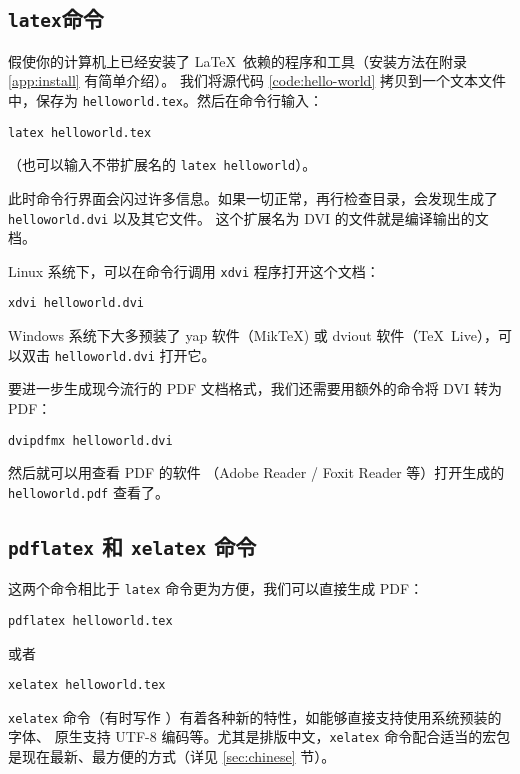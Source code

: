 \subsection{\texttt{latex}命令}\label{subsec:latex-exe}

假使你的计算机上已经安装了 \LaTeX\ 依赖的程序和工具（安装方法在附录 \ref{app:install} 有简单介绍）。
我们将源代码 \ref{code:hello-world} 拷贝到一个文本文件中，保存为 \texttt{helloworld.tex}。然后在命令行输入：
\begin{verbatim}
latex helloworld.tex
\end{verbatim}
（也可以输入不带扩展名的 \texttt{latex helloworld}）。

此时命令行界面会闪过许多信息。如果一切正常，再行检查目录，会发现生成了 \texttt{hello\-world.dvi} 以及其它文件。
这个扩展名为 DVI 的文件就是编译输出的文档。

Linux 系统下，可以在命令行调用 \texttt{xdvi} 程序打开这个文档：
\begin{verbatim}
xdvi helloworld.dvi
\end{verbatim}

Windows 系统下大多预装了 yap 软件（Mik\TeX) 或 dviout 软件（\TeX\ Live），可以双击 \texttt{hello\-world.dvi} 打开它。

要进一步生成现今流行的 PDF 文档格式，我们还需要用额外的命令将 DVI 转为 PDF：
\begin{verbatim}
dvipdfmx helloworld.dvi
\end{verbatim}

然后就可以用查看 PDF 的软件 （Adobe Reader / Foxit Reader 等）打开生成的 \texttt{hello\-world.pdf} 查看了。

\subsection{\texttt{pdflatex} 和 \texttt{xelatex} 命令}\label{subsec:pdflatex-exe}

这两个命令相比于 \texttt{latex} 命令更为方便，我们可以直接生成 PDF：
\begin{verbatim}
pdflatex helloworld.tex
\end{verbatim}

或者
\begin{verbatim}
xelatex helloworld.tex
\end{verbatim}

\texttt{xelatex} 命令（有时写作 ）有着各种新的特性，如能够直接支持使用系统预装的字体、
原生支持 UTF-8 编码等。尤其是排版中文，\texttt{xelatex} 命令配合适当的宏包是现在最新、最方便的方式（详见 \ref{sec:chinese} 节）。

